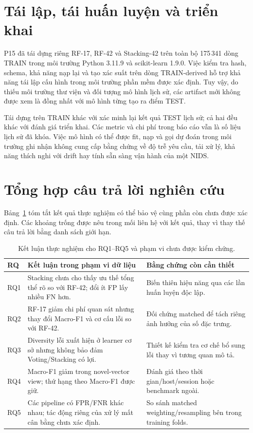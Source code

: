 \section{Tái lập, tái huấn luyện và triển khai}
\label{sec:discussion-reproducibility}

P15 đã tái dựng riêng RF-17, RF-42 và Stacking-42 trên toàn bộ 175\,341 dòng TRAIN trong môi trường Python 3.11.9 và scikit-learn 1.9.0. Việc kiểm tra hash, schema, khả năng nạp lại và tạo xác suất trên dòng TRAIN-derived hỗ trợ khả năng tái lập cấu hình trong môi trường phần mềm được xác định. Tuy vậy, do thiếu môi trường thư viện và đối tượng mô hình lịch sử, các artifact mới không được xem là đồng nhất với mô hình từng tạo ra điểm TEST.

Tái dựng trên TRAIN khác với xác minh lại kết quả TEST lịch sử; cả hai đều khác với đánh giá triển khai. Các metric và chi phí trong báo cáo vẫn là số liệu lịch sử đã khóa. Việc mô hình có thể được fit, nạp và gọi dự đoán trong môi trường ghi nhận không cung cấp bằng chứng về độ trễ yêu cầu, tải xử lý, khả năng thích nghi với drift hay tính sẵn sàng vận hành của một NIDS.

\section{Tổng hợp câu trả lời nghiên cứu}
\label{sec:revision-rq-map}

Bảng~\ref{tab:rq-evidence} tóm tắt kết quả thực nghiệm có thể bảo vệ cùng phần còn chưa được xác định. Các khoảng trống được nêu trong mối liên hệ với kết quả, thay vì thay thế câu trả lời bằng danh sách giới hạn.

\begin{table}[htbp]
\centering
\small
\renewcommand{\arraystretch}{1.35}
\setlength{\tabcolsep}{6pt}
\caption{Kết luận thực nghiệm cho RQ1--RQ5 và phạm vi chưa được kiểm chứng.}
\label{tab:rq-evidence}
\begin{tabularx}{\linewidth}{p{0.9cm} X X}
\toprule
RQ & Kết luận trong phạm vi dữ liệu & Bằng chứng còn cần thiết\\
\midrule
RQ1 & Stacking chưa cho thấy ưu thế tổng thể rõ so với RF-42; đổi ít FP lấy nhiều FN hơn. & Biến thiên hiệu năng qua các lần huấn luyện độc lập.\\
RQ2 & RF-17 giảm chi phí quan sát nhưng thay đổi Macro-F1 và cơ cấu lỗi so với RF-42. & Đối chứng matched để tách riêng ảnh hưởng của số đặc trưng.\\
RQ3 & Diversity lỗi xuất hiện ở learner cơ sở nhưng không bảo đảm Voting/Stacking có lợi. & Thiết kế kiểm tra cơ chế bổ sung lỗi thay vì tương quan mô tả.\\
RQ4 & Macro-F1 giảm trong novel-vector view; thứ hạng theo Macro-F1 được giữ. & Đánh giá theo thời gian/host/session hoặc benchmark ngoài.\\
RQ5 & Các pipeline có FPR/FNR khác nhau; tác động riêng của xử lý mất cân bằng chưa xác định. & So sánh matched weighting/resampling bên trong training folds.\\
\bottomrule
\end{tabularx}
\end{table}

